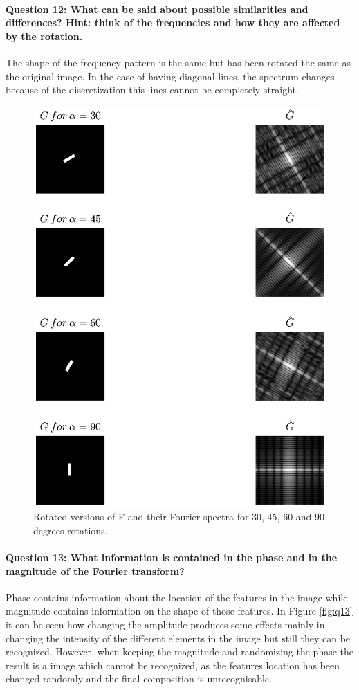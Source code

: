 \documentclass[12pt]{article}
\begin{document}
\paragraph{Question 12: What can be said about possible similarities and differences? Hint: think of the frequencies and how they are affected by the rotation.}
The shape of the frequency pattern is the same but has been rotated the same as the original image. In the case of having diagonal lines, the spectrum changes because of the discretization this lines cannot be completely straight.
\begin{figure}[htbp]
 \centering
 \includegraphics[width=\textwidth]{q12}
 \caption{Rotated versions of F and their Fourier spectra for 30, 45, 60 and 90 degrees rotations.}
 \label{fig:q12}
\end{figure}

\paragraph{Question 13: What information is contained in the phase and in the magnitude of the Fourier transform?}
Phase contains information about the location of the features in the image while magnitude contains information on the shape of those features. In Figure \ref{fig:q13} it can be seen how changing the amplitude produces some effects mainly in changing the intensity of the different elements in the image but still they can be recognized. However, when keeping the magnitude and randomizing the phase the result is a image which cannot be recognized, as the features location has been changed randomly and the final composition is unrecognisable.
\end{document}
